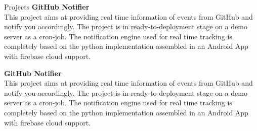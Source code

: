 \documentclass[10pt]{resume}
\begin{document}
\begin{rSection}{Projects}
{\bf GitHub Notifier}
\\This project aims at providing real time information of events from GitHub and notify you accordingly. The project is in ready-to-deployment stage on a demo server as a cron-job. The notification engine  used for real time tracking is completely based on the python implementation assembled in an Android App with firebase cloud support.

{\bf GitHub Notifier}
\\This project aims at providing real time information of events from GitHub and notify you accordingly. The project is in ready-to-deployment stage on a demo server as a cron-job. The notification engine  used for real time tracking is completely based on the python implementation assembled in an Android App with firebase cloud support.

\end{rSection}

% 
% 

% 
\end{document}
